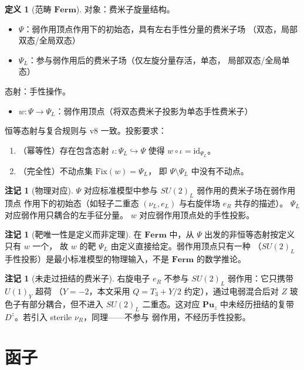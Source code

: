 \documentclass[11pt]{ctexart}
\theoremstyle{plain}
\theoremstyle{definition}
\newtheorem{defn}[thm]{定义}
\newtheorem{rem}[thm]{注记}
\newcommand{\Cat}{\mathbf}
\begin{document}
\begin{defn}[范畴 $\Cat{Ferm}$]\label{def:ferm}
对象：费米子旋量结构。
\begin{itemize}
\item $\Psi$：弱作用顶点作用下的初始态，具有左右手性分量的费米子场
（双态，局部双态/全局双态）
\item $\Psi_L$：参与弱作用后的费米子场（仅左旋分量存活，单态，
局部双态/全局单态）
\end{itemize}
态射：手性操作。
\begin{itemize}
\item $w: \Psi \to \Psi_L$：弱作用顶点（将双态费米子投影为单态手性费米子）
\end{itemize}
恒等态射与复合规则与 v8 一致。投影要求：
\begin{enumerate}
\item （幂等性）存在包含态射 $\iota: \Psi_L \hookrightarrow \Psi$ 使得
$w\circ\iota = \mathrm{id}_{\Psi_L}$。
\item （完全性）不动点集 $\mathrm{Fix}(w) = \Psi_L$，
即 $\Psi\setminus\Psi_L$ 中没有不动点。
\end{enumerate}
\end{defn}

\begin{rem}[物理对应]\label{rem:physical}
$\Psi$ 对应标准模型中参与 $SU(2)_L$ 弱作用的费米子场在弱作用顶点
作用下的初始态（如轻子二重态 $(\nu_L,e_L)$ 与右旋伴场 $e_R$ 共存的描述）。
$\Psi_L$ 对应弱作用只耦合的左手征分量。
$w$ 对应弱作用顶点处的手性投影。
\end{rem}

\begin{rem}[靶唯一性是定义而非定理]\label{rem:targetbydef}
在 $\Cat{Ferm}$ 中，从 $\Psi$ 出发的非恒等态射按定义只有 $w$ 一个，
故 $w$ 的靶 $\Psi_L$ 由定义直接给定。弱作用顶点只有一种
（$SU(2)_L$ 手性投影）是最小标准模型的物理输入，不是 $\Cat{Ferm}$
的数学推论。
\end{rem}

\begin{rem}[未走过扭结的费米子]\label{rem:untwisted}
右旋电子 $e_R$ 不参与 $SU(2)_L$ 弱作用：它只携带 $U(1)_Y$ 超荷
（$Y=-2$，本文采用 $Q = T_3 + Y/2$ 约定），通过电弱混合后对 $Z$
玻色子有部分耦合，但不进入 $SU(2)_L$ 二重态。这对应 $\Cat{Pu}_z$
中未经历扭结的复带 $D^z$。若引入 sterile $\nu_R$，同理——不参与
弱作用，不经历手性投影。
\end{rem}

\section{函子}
\end{document}
